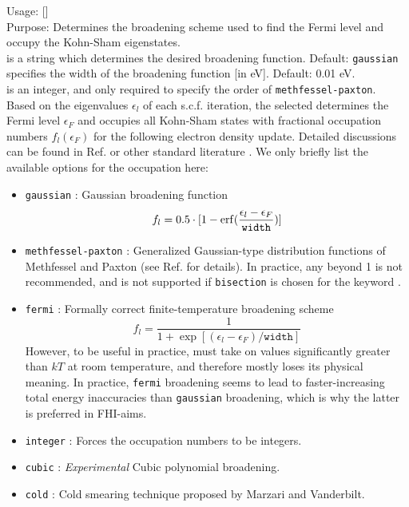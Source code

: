 {
  \noindent
  Usage:   
    [] \\[1.0ex]
  Purpose: Determines the broadening scheme used to find the Fermi level and
    occupy the Kohn-Sham eigenstates. \\[1.0ex]
   is a string which determines the desired broadening function.
    Default: \texttt{gaussian} \\
   specifies the width of the broadening function [in eV].
    Default: 0.01 eV. \\
   is an integer, and only required to specify the order of
     \texttt{methfessel-paxton}. \\
}
Based on the eigenvalues $\epsilon_l$ of each s.c.f. iteration, the selected
 determines the Fermi level $\epsilon_F$ and occupies
all Kohn-Sham states with fractional occupation numbers $f_l(\epsilon_F)$ for
the following electron density update. Detailed discussions can be found in
Ref. \cite{Blum08} or other standard literature \cite{Kre96}. We only briefly
list the available options for the occupation  here:
\begin{itemize}
  \item \texttt{gaussian} : Gaussian broadening function \cite{Fu83}
    \[
       f_l = 0.5 \cdot [1 -
       \mathop{\mathrm{erf}}(\frac{\epsilon_l-\epsilon_F}{\mathtt{width}})]
    \]
  \item \texttt{methfessel-paxton} : Generalized Gaussian-type distribution
    functions of Methfessel and Paxton (see Ref. \cite{Met89} for details). In
    practice, any  beyond 1 is not recommended, and is not
    supported if \texttt{bisection} is chosen for the keyword
    .
  \item \texttt{fermi} : Formally correct finite-temperature broadening
    scheme \cite{Mermin65}
    \[
       f_l = \frac{1}{1+\exp[(\epsilon_l-\epsilon_F)/\mathtt{width}]}
    \]
    However, to be useful in practice,  must take on values
    significantly greater than $kT$ at room temperature, and therefore mostly
    loses its physical meaning. In practice, \texttt{fermi} broadening seems to
    lead to faster-increasing total energy inaccuracies than \texttt{gaussian}
    broadening, which is why the latter is preferred in FHI-aims.
  \item \texttt{integer} : Forces the occupation numbers to be integers.
  \item \texttt{cubic} : \emph{Experimental} Cubic polynomial broadening.
  \item \texttt{cold} : Cold smearing technique proposed by Marzari and
    Vanderbilt.
\end{itemize}
